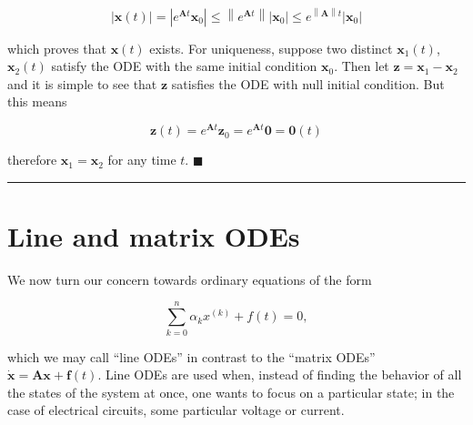 \begin{equation} \left\lvert \mathbf{x}(t)\right\rvert = \left\lvert e^{\mathbf{A}t} \mathbf{x}_0\right\rvert \leq \left\lVert e^{\mathbf{A}t} \right\rVert\left\lvert \mathbf{x}_0\right\rvert \leq e^{\left\lVert\mathbf{A}\right\rVert t} \left\lvert \mathbf{x}_0\right\rvert\end{equation}

	\noindent which proves that $\mathbf{x}(t)$ exists. For uniqueness, suppose two distinct $\mathbf{x}_1(t)$, $\mathbf{x}_2(t)$ satisfy the ODE with the same initial condition $\mathbf{x}_0$. Then let $\mathbf{z} = \mathbf{x}_1 - \mathbf{x}_2$ and it is simple to see that $\mathbf{z}$ satisfies the ODE with null initial condition. But this means

\begin{equation} \mathbf{z}(t) = e^{\mathbf{A}t}\mathbf{z}_0 = e^{\mathbf{A}t}\mathbf{0} = \mathbf{0}(t)\end{equation}

	\noindent therefore $\mathbf{x}_1 = \mathbf{x}_2$ for any time $t$.
\hfill$\blacksquare$
\vspace{5mm}
\hrule
\vspace{5mm}

\section{Line and matrix ODEs}\label{sec:line_matrix_ode} %

	We now turn our concern towards ordinary equations of the form 	

\begin{equation} \sum\limits_{k=0}^n \alpha_k x^{\left(k\right)} + f(t) = 0, \label{eq:line_ode_def}\end{equation}

	\noindent which we may call ``line ODEs'' in contrast to the ``matrix ODEs'' $\dot{\mathbf{x}} = \mathbf{Ax + f}(t)$. Line ODEs are used when, instead of finding the behavior of all the states of the system at once, one wants to focus on a particular state; in the case of electrical circuits, some particular voltage or current.

